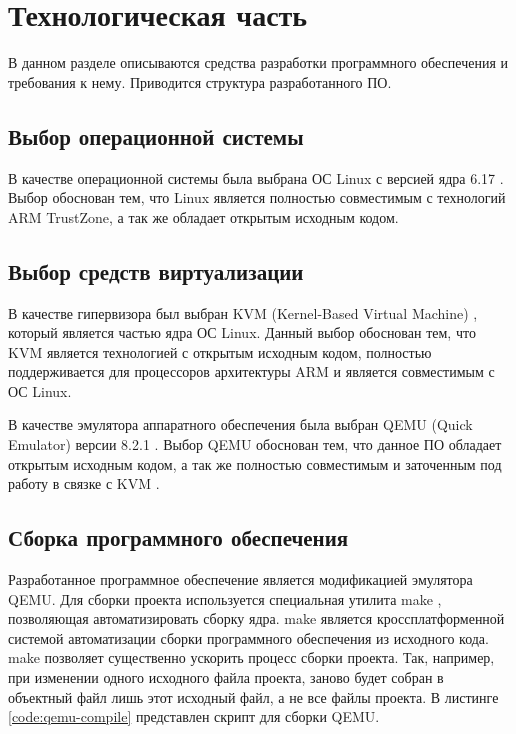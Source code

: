 \section{Технологическая часть}

В данном разделе описываются средства разработки программного обеспечения и требования к нему. Приводится структура разрабо­танного ПО.

\subsection{Выбор операционной системы}

В качестве операционной системы была выбрана ОС Linux с версией ядра 6.17 \cite{linux}. Выбор обоснован тем, что Linux является полностью совместимым с технологий ARM TrustZone, а так же обладает открытым исходным кодом.

\subsection{Выбор средств виртуализации}

В качестве гипервизора был выбран KVM (Kernel-Based Virtual Machine) \cite{kvm}, который является частью ядра ОС Linux. Данный выбор обоснован тем, что KVM является технологией с открытым исходным кодом, полностью поддерживается для процессоров архитектуры ARM и является совместимым с ОС Linux.

В качестве эмулятора аппаратного обеспечения была выбран QEMU (Quick Emulator) версии 8.2.1 \cite{qemu}. Выбор QEMU обоснован тем, что данное ПО обладает открытым исходным кодом, а так же полностью совместимым и заточенным под работу в связке с KVM \cite{kvm}.

\subsection{Сборка программного обеспечения}

Разработанное программное обеспечение является модификацией эмулятора QEMU. Для сборки проекта используется специальная утилита make \cite{make}, позволяющая автоматизировать сборку ядра. make является кроссплатформенной системой автоматизации сборки программного обеспечения из исходного кода. make позволяет существенно ускорить процесс сборки проекта. Так, например, при изменении одного исходного файла проекта, заново будет собран в объектный файл лишь этот исходный файл, а не все файлы проекта. В листинге \ref{code:qemu-compile} представлен скрипт для сборки QEMU.

